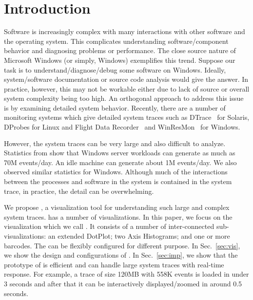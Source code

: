 \section{Introduction}

Software is increasingly complex with many interactions with other software
and the operating system.
This complicates understanding software/component behavior and diagnosing
problems or performance.
The close source nature of Microsoft Windows (or simply, Windows) exemplifies this trend.
Suppose our task is to understand/diagnose/debug some software on Windows.
Ideally, system/software documentation or source code
analysis would give the answer.
In practice, however, this may not be
workable either due to lack of source or overall
system complexity being too high.
An orthogonal approach to address this issue is by examining
detailed system behavior.
Recently, there are a number of monitoring systems which
give detailed system traces such as DTrace~\cite{dtrace} for Solaris,
DProbes for Linux and Flight Data Recorder~\cite{fdr}
and WinResMon~\cite{winresmon} for Windows.

However, the system traces can be very large and also
difficult to analyze. Statistics from \cite{fdr} show that Windows
server workloads can generate as much as 70M events/day.
An idle machine can generate about 1M events/day. We also
observed similar statistics for Windows. Although much of
the interactions between the processes and software in the
system is contained in the system trace, in practice, the detail
can be overwhelming.


We propose \lviz{}, a visualization tool for
understanding such large and complex system traces.
\lviz{} has a number of visualizations.
In this paper, we focus on the visualization which we call \VDP{}.
It consists of a number of inter-connected sub-visualizations:
an extended DotPlot;
two Axis Histograms; and one or more barcodes.
The \VDP{} can be flexibly configured for different purpose.
In Sec.~\ref{sec:vis}, we show the design and configurations of \VDP{}.
In Sec.~\ref{sec:imp}, we show that
the prototype of \lviz{} is efficient and can handle large system traces
with real-time response. For example, a trace of size 120MB with 558K events 
is loaded in under 3 seconds
and after that it can be interactively displayed/zoomed in around 0.5 seconds.

